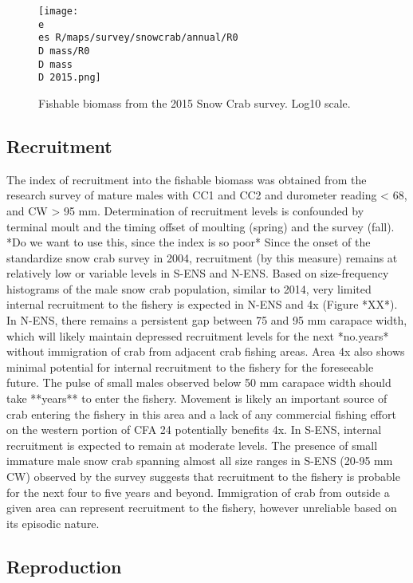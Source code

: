\documentclass[paper=a4, fontsize=11pt]{article}
\newcommand{\D}{.}
\newcommand{\e}{/home/michelle/ecomod_data/}
\newcommand{\es}{snowcrab/}
\begin{document}
\begin{figure}[ht]
    \centering
    \texttt{[image: \\e \\es R/maps/survey/snowcrab/annual/R0\\D mass/R0\\D mass\\D 2015.png]}
    \caption{Fishable biomass from the 2015 Snow Crab survey. Log10 scale.}
\end{figure}

\subsection{Recruitment}
The index of recruitment into the fishable biomass was obtained from the research survey of mature males with CC1 and CC2 and durometer reading < 68, and CW > 95 mm. Determination of recruitment levels is confounded by terminal moult and the timing offset of moulting (spring) and the survey (fall). *Do we want to use this, since the index is so poor* Since the onset of the standardize snow crab survey in 2004, recruitment (by this measure) remains at relatively low or variable levels in S-ENS and N-ENS. Based on size-frequency histograms of the male snow crab population, similar to 2014, very limited internal recruitment to the fishery is expected in N-ENS and 4x (Figure *XX*). In N-ENS, there remains a persistent gap between 75 and 95 mm carapace width, which will likely maintain depressed recruitment levels for the next *no.years* without immigration of crab from adjacent crab fishing areas. Area 4x also shows minimal potential for internal recruitment to the fishery for the foreseeable future. The pulse of small males observed below 50 mm carapace width should take **years** to enter the fishery. Movement is likely an important source of crab entering the fishery in this area and a lack of any commercial fishing effort on the western portion of CFA 24 potentially benefits 4x. In S-ENS, internal recruitment is expected to remain at moderate levels. The presence of small immature male snow crab spanning almost all size ranges in S-ENS (20-95 mm CW) observed by the survey suggests that recruitment to the fishery is probable for the next four to five years and beyond. Immigration of crab from outside a given area can represent recruitment to the fishery, however unreliable based on its episodic nature.

\subsection{Reproduction}
\end{document}
